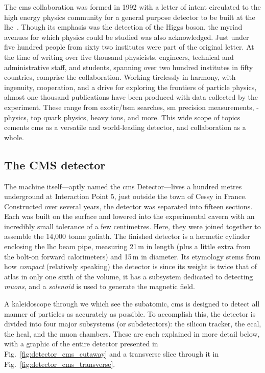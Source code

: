 The \acrfull{cms} collaboration was formed in 1992 with a letter of intent circulated to the high energy physics community for a general purpose detector to be built at the \acrshort{lhc}~\cite{DellaNegra:290808}. Though its emphasis was the detection of the Higgs boson, the myriad avenues for which physics could be studied was also acknowledged. Just under five hundred people from sixty two institutes were part of the original letter. At the time of writing over five thousand physicists, engineers, technical and administrative staff, and students, spanning over two hundred institutes in fifty countries, comprise the collaboration. Working tirelessly in harmony, with ingenuity, cooperation, and a drive for exploring the frontiers of particle physics, almost one thousand publications have been produced with data collected by the experiment. These range from exotic/\acrshort{bsm} searches, \acrlong{sm} precision measurements, \PB-physics, top quark physics, heavy ions, and more. This wide scope of topics cements \acrshort{cms} as a versatile and world-leading detector, and collaboration as a whole.





\subsection{The CMS detector}
\label{subsec:cms_detector_itself}

The machine itself---aptly named the \acrshort{cms} Detector---lives a hundred metres underground at Interaction Point 5, just outside the town of Cessy in France. Constructed over several years, the detector was separated into fifteen sections. Each was built on the surface and lowered into the experimental cavern with an incredibly small tolerance of a few centimetres. Here, they were joined together to assemble the 14,000 tonne goliath. The finished detector is a hermetic cylinder enclosing the \acrshort{lhc} beam pipe, measuring 21\,m in length (plus a little extra from the bolt-on forward calorimeters) and 15\,m in diameter. Its etymology stems from how \emph{compact} (relatively speaking) the detector is since its weight is twice that of \acrshort{atlas} in only one sixth of the volume, it has a subsystem dedicated to detecting \emph{muons}, and a \emph{solenoid} is used to generate the magnetic field.

A kaleidoscope through we which see the subatomic, \acrshort{cms} is designed to detect all manner of particles as accurately as possible. To accomplish this, the detector is divided into four major subsystems (or subdetectors): the silicon tracker, the \acrfull{ecal}, the \acrfull{hcal}, and the muon chambers. These are each explained in more detail below, with a graphic of the entire detector presented in Fig.~\ref{fig:detector_cms_cutaway} and a transverse slice through it in Fig.~\ref{fig:detector_cms_transverse}.

